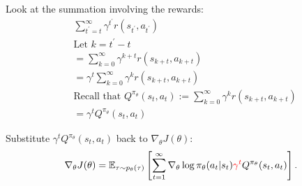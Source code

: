 Look at the summation involving the rewards:
\begin{equation}
    \begin{aligned}
        & \sum_{t^\prime = t}^{\infty} \gamma^{t^\prime} r(s_{t^\prime}, a_{t^\prime}) \\
        & \text{Let $k = t^\prime - t$} \\
        & = \sum_{k=0}^{\infty} \gamma^{k+t} r(s_{k+t}, a_{k+t}) \\
        & = \gamma^t \sum_{k=0}^{\infty} \gamma^k r(s_{k+t}, a_{k+t}) \\
        & \text{Recall that $Q^{\pi_\theta}(s_t, a_t):= \sum_{k=0}^{\infty} \gamma^k r(s_{k+t}, a_{k+t})$} \\
        & = \gamma^t Q^{\pi_\theta}(s_t, a_t)
    \end{aligned}
\end{equation}

Substitute $ \gamma^t Q^{\pi_\theta}(s_t, a_t)$ back to $\nabla_\theta J(\theta)$:
\[
         \nabla_\theta J(\theta) = \mathbb{E}_{\tau \sim p_\theta(\tau)}\left[ \sum_{t=1}^{\infty} \nabla_\theta \log \pi_{\theta}(a_t | s_t)   \textcolor{red}{\gamma^t} Q^{\pi_\theta}(s_t, a_t)  \right].
\]

